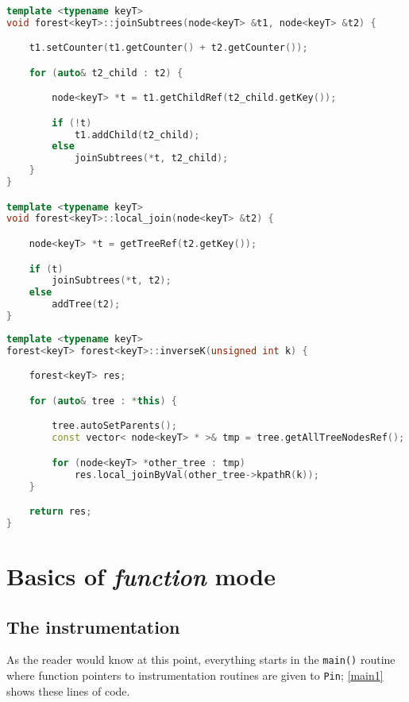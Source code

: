 \documentclass[a4paper,10pt]{report}
\begin{document}
\begin{lstlisting}[language=C++,
	caption={the implementation of the $join$ operation},
	label=joinop, frame=leftline]

template <typename keyT>
void forest<keyT>::joinSubtrees(node<keyT> &t1, node<keyT> &t2) {

    t1.setCounter(t1.getCounter() + t2.getCounter());

	for (auto& t2_child : t2) {

		node<keyT> *t = t1.getChildRef(t2_child.getKey());

		if (!t)
			t1.addChild(t2_child);
		else
			joinSubtrees(*t, t2_child);
	}
}

template <typename keyT>
void forest<keyT>::local_join(node<keyT> &t2) {

	node<keyT> *t = getTreeRef(t2.getKey());

	if (t)
		joinSubtrees(*t, t2);
	else
		addTree(t2);
}

\end{lstlisting}

\begin{lstlisting}[language=C++,
	caption={the implementation of the $inv_k$ operation},
	label=invk, frame=leftline]
template <typename keyT>
forest<keyT> forest<keyT>::inverseK(unsigned int k) {

    forest<keyT> res;

	for (auto& tree : *this) {

		tree.autoSetParents();
		const vector< node<keyT> * >& tmp = tree.getAllTreeNodesRef();

		for (node<keyT> *other_tree : tmp)
			res.local_joinByVal(other_tree->kpathR(k));
	}

	return res;
}
\end{lstlisting}

\section{Basics of \emph{function} mode}

\subsection{The instrumentation}

As the reader would know at this point, everything starts in the \verb|main()| routine
where function pointers to instrumentation routines are given to \texttt{Pin};
\cref{main1} shows these lines of code.
\end{document}
